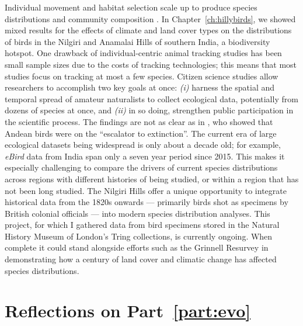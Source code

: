Individual movement and habitat selection scale up to produce species distributions and community composition \citep{schlagel2020a}.
In Chapter~\ref{ch:hillybirds}, we showed mixed results for the effects of climate and land cover types on the distributions of birds in the Nilgiri and Anamalai Hills of southern India, a biodiversity hotspot.
One drawback of individual-centric animal tracking studies has been small sample sizes due to the costs of tracking technologies; this means that most studies focus on tracking at most a few species.
Citizen science studies allow researchers to accomplish two key goals at once: \textit{(i)} harness the spatial and temporal spread of amateur naturalists to collect ecological data, potentially from dozens of species at once, and \textit{(ii)} in so doing, strengthen public participation in the scientific process.
The findings are not as clear as in \textcite{freeman2018}, who showed that Andean birds were on the ``escalator to extinction''.
The current era of large ecological datasets being widespread is only about a decade old; for example, \textit{eBird} data from India span only a seven year period since 2015.
This makes it especially challenging to compare the drivers of current species distributions across regions with different histories of being studied, or within a region that has not been long studied.
The Nilgiri Hills offer a unique opportunity to integrate historical data from the 1820s onwards --- primarily birds shot as specimens by British colonial officials --- into modern species distribution analyses.
This project, for which I gathered data from bird specimens stored in the Natural History Museum of London's Tring collections, is currently ongoing.
When complete it could stand alongside efforts such as the Grinnell Resurvey \citep{tingley2009a,tingley2009b} in demonstrating how a century of land cover and climatic change has affected species distributions.

\section*{Reflections on Part~\ref{part:evo}}

